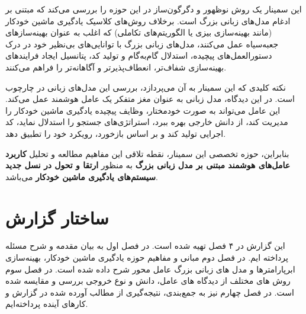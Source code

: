این سمینار یک روش نوظهور و دگرگون‌ساز در این حوزه را بررسی می‌کند که مبتنی بر ادغام مدل‌های زبانی بزرگ است. برخلاف روش‌های کلاسیک یادگیری ماشین خودکار (مانند بهینه‌سازی بیزی یا الگوریتم‌های تکاملی) که اغلب به عنوان بهینه‌سازهای جعبه‌سیاه عمل می‌کنند، مدل‌های زبانی بزرگ با توانایی‌های بی‌نظیر خود در درک دستورالعمل‌های پیچیده، استدلال گام‌به‌گام و تولید کد، پتانسیل ایجاد فرایندهای بهینه‌سازی شفاف‌تر، انعطاف‌پذیرتر و آگاهانه‌تر را فراهم می‌کنند.

نکته کلیدی که این سمینار به آن می‌پردازد، بررسی این مدل‌های زبانی در چارچوب  است. در این دیدگاه، مدل زبانی به عنوان مغز متفکر یک عامل هوشمند عمل می‌کند. این عامل می‌تواند به صورت خودمختار، وظایف پیچیده یادگیری ماشین خودکار را مدیریت کند، از دانش خارجی بهره ببرد، استراتژی‌های جستجو را استدلال نماید، کد اجرایی تولید کند و بر اساس بازخورد، رویکرد خود را تطبیق دهد.

بنابراین، حوزه تخصصی این سمینار، نقطه تلاقی این مفاهیم مطالعه و تحلیل \textbf{کاربرد عامل‌های هوشمند مبتنی بر مدل زبانی بزرگ} به منظور \textbf{ارتقا و تحول در نسل جدید سیستم‌های یادگیری ماشین خودکار }می‌باشد.

\section{ساختار گزارش}
این گزارش در ۴ فصل تهیه شده است. در فصل اول به بیان مقدمه و شرح مسئله پرداخته ایم. در فصل دوم مبانی و مفاهیم حوزه یادگیری ماشین خودکار، بهینه‌سازی ابرپارامترها و مدل های زبانی بزرگ عامل محور شرح داده شده است. در فصل سوم روش های مختلف از دیدگاه های عامل، دانش و نوع خروجی بررسی و مقایسه شده است. در فصل چهارم نیز به جمع‌بندی، نتیجه‌گیری از مطالب آورده شده در گزارش و کارهای آینده پرداخته‌ایم.
